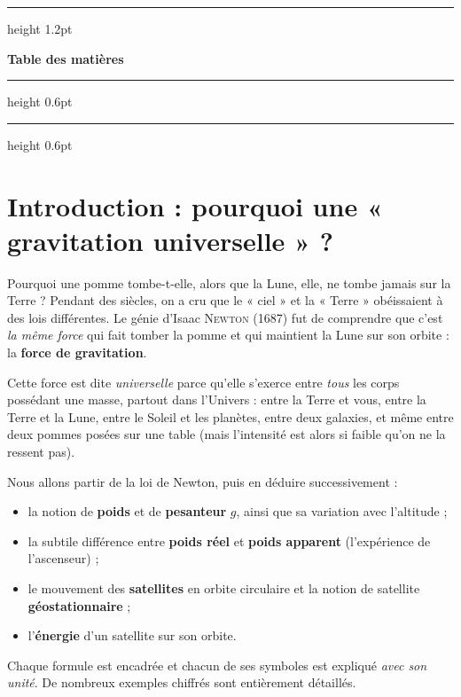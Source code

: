 \documentclass[11pt,a4paper]{article}
\begin{document}
\newpage
{\color{primarydark}\hrule height 1.2pt}
\vspace{4pt}
{\Large\bfseries\color{primarydark}Table des matières}
\vspace{4pt}
{\color{primarydark}\hrule height 0.6pt}
\vspace{6pt}
\renewcommand{\contentsname}{}
\vspace{-1.2cm}
\tableofcontents
\vspace{0.4cm}
{\color{primary}\hrule height 0.6pt}

\newpage

\section{Introduction : pourquoi une « gravitation universelle » ?}

Pourquoi une pomme tombe-t-elle, alors que la Lune, elle, ne tombe jamais sur
la Terre ? Pendant des siècles, on a cru que le « ciel » et la « Terre » obéissaient
à des lois différentes. Le génie d'Isaac \textsc{Newton} (1687) fut de comprendre
que c'est \emph{la même force} qui fait tomber la pomme et qui maintient la Lune
sur son orbite : la \textbf{force de gravitation}.

Cette force est dite \emph{universelle} parce qu'elle s'exerce entre \emph{tous} les
corps possédant une masse, partout dans l'Univers : entre la Terre et vous, entre la
Terre et la Lune, entre le Soleil et les planètes, entre deux galaxies, et même
entre deux pommes posées sur une table (mais l'intensité est alors si faible qu'on
ne la ressent pas).

\begin{remarque}
Nous allons partir de la loi de Newton, puis en déduire successivement :
\begin{itemize}[leftmargin=1.6em,topsep=2pt,itemsep=1pt]
  \item la notion de \textbf{poids} et de \textbf{pesanteur} $g$, ainsi que sa
        variation avec l'altitude ;
  \item la subtile différence entre \textbf{poids réel} et \textbf{poids apparent}
        (l'expérience de l'ascenseur) ;
  \item le mouvement des \textbf{satellites} en orbite circulaire et la notion de
        satellite \textbf{géostationnaire} ;
  \item l'\textbf{énergie} d'un satellite sur son orbite.
\end{itemize}
Chaque formule est encadrée et chacun de ses symboles est expliqué \emph{avec son
unité}. De nombreux exemples chiffrés sont entièrement détaillés.
\end{remarque}
\end{document}
